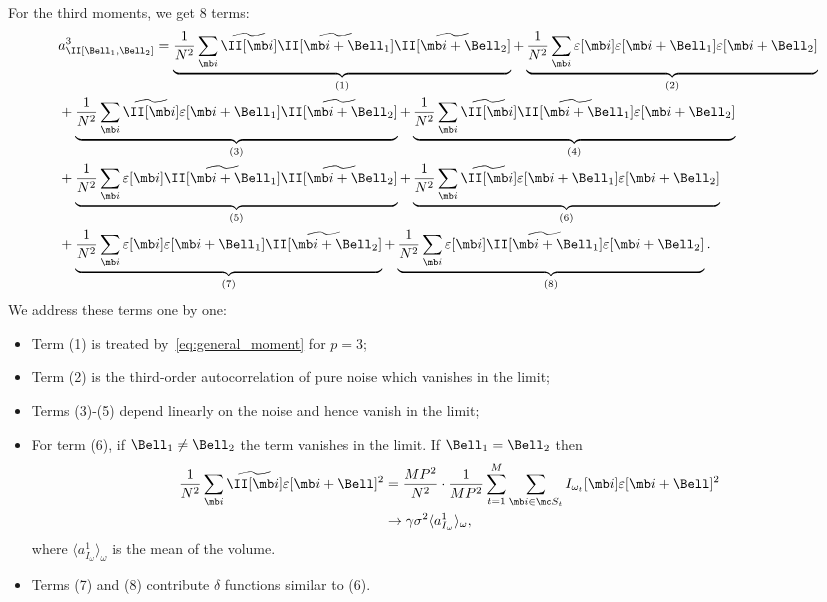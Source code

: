 \documentclass[9pt,twocolumn,twoside,lineno]{pnas-new}
\begin{document}
For the third moments, we get 8 terms:
\[\begin{aligned} 
&a^3_\II[\Bell_1, \Bell_2] =
\underbrace{\frac{1}{N^2}\sum_{\mb i}\widetilde\II[\mb i]\widetilde\II[\mb i+\Bell_1]\widetilde\II[\mb i + \Bell_2]}_{(1)} +
\underbrace{\frac{1}{N^2}\sum_{\mb i}\varepsilon[\mb i]\varepsilon[\mb i+\Bell_1]\varepsilon[\mb i + \Bell_2]}_{(2)}\\ 
&+ \underbrace{\frac{1}{N^2}\sum_{\mb i}\widetilde\II[\mb i]\varepsilon[\mb i + \Bell_1]\widetilde\II[\mb i + \Bell_2]}_{(3)} +
\underbrace{\frac{1}{N^2}\sum_{\mb i}\widetilde\II[\mb i]\widetilde\II[\mb i + \Bell_1]\varepsilon[\mb i + \Bell_2]}_{(4)}\\
&+ \underbrace{\frac{1}{N^2}\sum_{\mb i}\varepsilon[\mb i]\widetilde\II[\mb i + \Bell_1]\widetilde\II[\mb i + \Bell_2]}_{(5)} +
\underbrace{\frac{1}{N^2}\sum_{\mb i}\widetilde\II[\mb i]\varepsilon[\mb i + \Bell_1]\varepsilon[\mb i + \Bell_2]}_{(6)}\\
&+ \underbrace{\frac{1}{N^2}\sum_{\mb i}\varepsilon[\mb i]\varepsilon[\mb i + \Bell_1]\widetilde\II[\mb i + \Bell_2]}_{(7)} +
\underbrace{\frac{1}{N^2}\sum_{\mb i}\varepsilon[\mb i]\widetilde\II[\mb i + \Bell_1]\varepsilon[\mb i + \Bell_2]}_{(8)}.
\end{aligned}\]
We address these terms one by one:
\begin{itemize}
	\item  Term (1) is treated by~\eqref{eq:general_moment} for $p=3$;
	\item Term (2) is the third-order autocorrelation of  pure noise  which vanishes in the limit; 
	\item Terms (3)-(5) depend linearly on the noise and hence
	vanish in the limit;
	\item For term (6), if $\Bell_1\neq \Bell_2$ the term
	vanishes in the limit. If $\Bell_1 = \Bell_2$ then
	\[ \begin{aligned}
	\frac{1}{N^2}\sum_{\mb i}\widetilde\II[\mb i]\varepsilon[\mb i + \Bell]^2
	&= \frac{MP^2}{N^2}\cdot\frac{1}{MP^2}\sum_{t=1}^{M}\sum_{\mb i\in\mc S_t}I_{\omega_t}[\mb i]\varepsilon[\mb i + \Bell]^2 
	\\& \to \gamma\sigma^2 \langle a^1_{I_{\omega}}\rangle_{\omega}, %
	\end{aligned}\]
	where $\langle a^1_{I_{\omega}}\rangle_{\omega}$ is the mean of the volume. 
	\item  Terms (7) and (8) contribute $\delta$ functions similar to (6).
\end{itemize}
\end{document}
